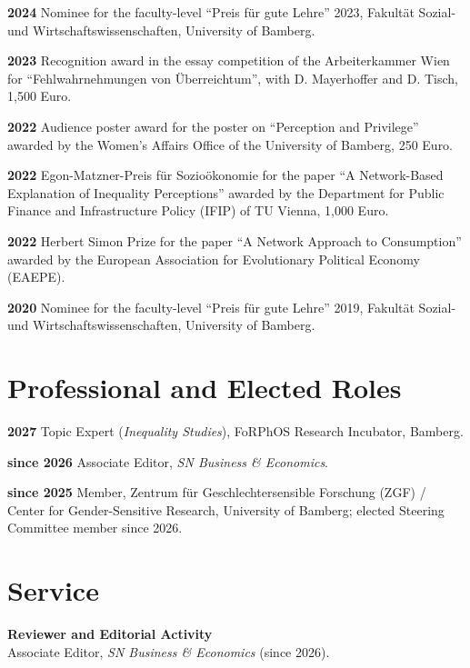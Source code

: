 \documentclass[margin]{res}
\begin{document}
\begin{resume}
	\textbf{2024} Nominee for the faculty-level ``Preis f\"ur gute Lehre'' 2023, Fakult\"at Sozial- und Wirtschaftswissenschaften, University of Bamberg.
	
	\textbf{2023} Recognition award in the essay competition of the Arbeiterkammer Wien for ``Fehlwahrnehmungen von \"Uberreichtum'', with D. Mayerhoffer and D. Tisch, 1,500 Euro.
	
	\textbf{2022} Audience poster award for the poster on ``Perception and Privilege'' awarded by the Women's Affairs Office of the University of Bamberg, 250 Euro.
	
	\textbf{2022} Egon-Matzner-Preis f\"ur Sozio\"okonomie for the paper ``A Network-Based Explanation of Inequality Perceptions'' awarded by the Department for Public Finance and Infrastructure Policy (IFIP) of TU Vienna, 1,000 Euro.
	
	\textbf{2022} Herbert Simon Prize for the paper ``A Network Approach to Consumption'' awarded by the European Association for Evolutionary Political Economy (EAEPE).
	
	\textbf{2020} Nominee for the faculty-level ``Preis f\"ur gute Lehre'' 2019, Fakult\"at Sozial- und Wirtschaftswissenschaften, University of Bamberg.
	
	\section{Professional and Elected Roles}
	\textbf{2027} Topic Expert (\textit{Inequality Studies}), FoRPhOS Research Incubator, Bamberg.
	
	\textbf{since 2026} Associate Editor, \textit{SN Business \& Economics}.
	
	\textbf{since 2025} Member, Zentrum f\"ur Geschlechtersensible Forschung (ZGF) / Center for Gender-Sensitive Research, University of Bamberg; elected Steering Committee member since 2026.
	
	\section{Service} 
	
	\textbf{Reviewer and Editorial Activity}\\
	Associate Editor, \textit{SN Business \& Economics} (since 2026).\\
	

\end{resume}
\end{document}
